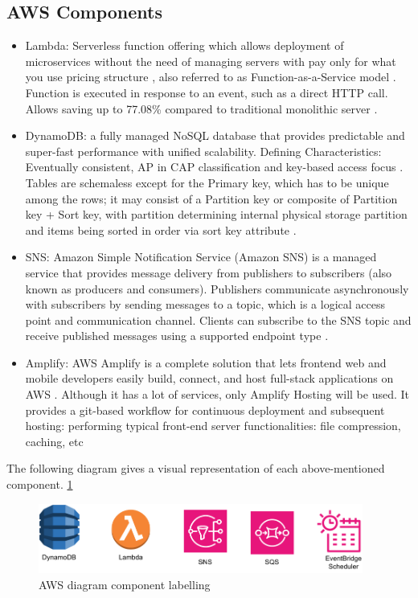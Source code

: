 \subsection{AWS Components}
\begin{itemize}
    \item Lambda: Serverless function offering which allows deployment of microservices without the need of managing servers with pay only for what you use pricing structure \cite{LambdaCostSave}, also referred to as Function-as-a-Service model \cite{MALAWSKI2020502}. Function is executed in response to an event, such as a direct HTTP call.  Allows saving up to 77.08\% compared to traditional monolithic server \cite{LambdaCostSave}.
    \item DynamoDB: a fully managed NoSQL database that provides predictable and super-fast performance with unified scalability. Defining Characteristics: Eventually consistent, AP in CAP classification and key-based access focus \cite{DynamoDB}. Tables are schemaless except for the Primary key, which has to be unique among the rows; it may consist of a Partition key or composite of Partition key + Sort key, with partition determining internal physical storage partition and items being sorted in order via sort key attribute \cite{awsDynamoWebsite}. 
    \item SNS: Amazon Simple Notification Service (Amazon SNS) is a managed service that provides message delivery from publishers to subscribers (also known as producers and consumers). Publishers communicate asynchronously with subscribers by sending messages to a topic, which is a logical access point and communication channel. Clients can subscribe to the SNS topic and receive published messages using a supported endpoint type \cite{sns}. 
    \item Amplify: AWS Amplify is a complete solution that lets frontend web and mobile developers easily build, connect, and host full-stack applications on AWS \cite{amplify}. Although it has a lot of services, only Amplify Hosting will be used. It provides a git-based workflow for continuous deployment and subsequent hosting: performing typical front-end server functionalities: file compression, caching, etc
\end{itemize}
The following diagram gives a visual representation of each above-mentioned component. \ref{fig:awsComponents}
\begin{figure}
    
    \centering
    \includegraphics[width=0.95\textwidth,keepaspectratio]{../images/AWS_components.pdf}
    \caption{AWS diagram component labelling}
    \label{fig:awsComponents}
\end{figure}
